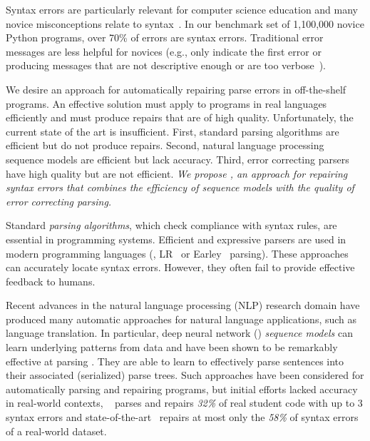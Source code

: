 Syntax errors are particularly relevant for computer science education and
many novice misconceptions relate to syntax~\citep{qian2017}. In our
benchmark set of 1,100,000 novice Python programs, over 70\% of errors
are syntax errors. Traditional error messages are
less helpful for novices (e.g., only indicate the first error or producing
messages that are not descriptive enough or are too
verbose~\citep{Kummerfeld2003, Ahadi_2018, VanDerSpek_2005}).

We desire an approach for automatically repairing parse errors in off-the-shelf
programs. An effective solution must apply to programs in real languages
efficiently and must produce repairs that are of high quality. Unfortunately,
the current state of the art is insufficient. First, standard parsing algorithms
are efficient but do not produce repairs. Second, natural language processing
sequence models are efficient but lack accuracy. Third, error correcting parsers
have high quality but are not efficient. \emph{We propose \toolname, an approach
for repairing syntax errors that combines the efficiency of sequence models with
the quality of error correcting parsing.}

Standard \emph{parsing algorithms}, which check compliance with syntax rules,
are essential in programming systems. Efficient and expressive parsers are used
in modern programming languages (\eg, LR~\citep{Aho1974} or
Earley~\citep{Earley_1970} parsing). These approaches can accurately locate
syntax errors. However, they often fail to provide effective feedback to humans.
%

Recent advances in the natural language processing (NLP) research domain
\citep{Sutskever_2014, Hardalov_2018} have produced many automatic approaches
for natural language applications, such as language translation. In particular,
deep neural network (\dnn) \emph{sequence models} can learn underlying patterns
from data and have been shown to be remarkably effective at parsing
\citep{Vinyals2015}. They are able to learn to effectively parse sentences into
their associated (serialized) parse trees. Such approaches have been considered
for automatically parsing and repairing programs, but initial efforts lacked
accuracy in real-world contexts, \eg~\citep{Ahmed_2021} parses and repairs
\emph{32\%} of real student code with up to 3 syntax errors and
state-of-the-art~\citep{Wu2020} repairs at most only the \emph{58\%} of syntax
errors of a real-world dataset.

